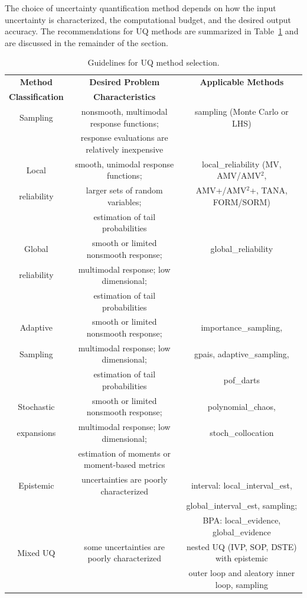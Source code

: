 The choice of uncertainty quantification method depends on how the
input uncertainty is characterized, the computational budget, and the
desired output accuracy.  The recommendations for UQ methods are
summarized in Table~\ref{usage:guideuq} and are discussed in the
remainder of the section.

\begin{table}[hbp]
\centering
\caption{Guidelines for UQ method selection.} \label{usage:guideuq}\vspace{2mm}
\begin{tabular}{|c|c|c|}
\hline
\textbf{Method} & \textbf{Desired Problem} & \textbf{Applicable Methods} \\
\textbf{Classification} & \textbf{Characteristics} & \\
\hline
Sampling & nonsmooth, multimodal response functions;       & sampling 
(Monte Carlo or LHS) \\
         & response evaluations are relatively inexpensive & \\
\hline
Local       & smooth, unimodal response functions; & local\_reliability
(MV, AMV/AMV$^2$,\\
reliability & larger sets of random variables;     & AMV+/AMV$^2$+, TANA, 
FORM/SORM) \\
            & estimation of tail probabilities     & \\
\hline
Global      & smooth or limited nonsmooth response; & global\_reliability \\
reliability & multimodal response; low dimensional; & \\
            & estimation of tail probabilities      & \\
\hline
Adaptive    & smooth or limited nonsmooth response; & importance\_sampling, \\
Sampling    & multimodal response; low dimensional; & gpais, adaptive\_sampling, \\
            & estimation of tail probabilities      & pof\_darts \\
\hline
Stochastic & smooth or limited nonsmooth response; & polynomial\_chaos, \\
expansions & multimodal response; low dimensional; & stoch\_collocation\\
           & estimation of moments or moment-based metrics & \\
\hline
Epistemic & uncertainties are poorly characterized &
interval: local\_interval\_est, \\
 & & global\_interval\_est, sampling; \\
 & & BPA: local\_evidence, global\_evidence \\
\hline
Mixed UQ  & some uncertainties are poorly characterized &
nested UQ (IVP, SOP, DSTE) with epistemic \\
 & & outer loop and aleatory inner loop, sampling \\
\hline
\end{tabular}
\end{table}


